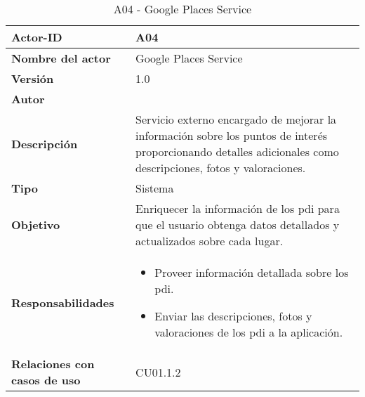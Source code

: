 \begin{table}[p]
	\centering
	\begin{tabularx}{\linewidth}{ p{} p{} }
		\toprule
		\textbf{Actor-ID}    & A04 \\
		\toprule
		\textbf{Nombre del actor} & Google Places Service \\
		\textbf{Versión}              & 1.0    \\
		\textbf{Autor}                & \autor \\
		\textbf{Descripción}          & Servicio externo encargado de mejorar la información sobre los puntos de interés proporcionando detalles adicionales como descripciones, fotos y valoraciones. \\
		\textbf{Tipo}                 & Sistema \\
		\textbf{Objetivo}             & Enriquecer la información de los \acrshort{pdi} para que el usuario obtenga datos detallados y actualizados sobre cada lugar. \\
		\textbf{Responsabilidades}    & 
		\begin{itemize}
			\tightlist
			\item Proveer información detallada sobre los \acrshort{pdi}.
			\item Enviar las descripciones, fotos y valoraciones de los \acrshort{pdi} a la aplicación.
		\end{itemize}\\
		\textbf{Relaciones con casos de uso} & CU01.1.2 \\
		\bottomrule
	\end{tabularx}
	\caption{A04 - Google Places Service}
\end{table}

